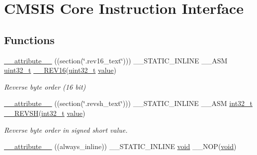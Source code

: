 \hypertarget{group___c_m_s_i_s___core___instruction_interface}{\section{C\-M\-S\-I\-S Core Instruction Interface}
\label{group___c_m_s_i_s___core___instruction_interface}
}
\subsection*{Functions}
\begin{DoxyCompactItemize}
\item 
\hyperlink{group___c_m_s_i_s___core___instruction_interface_gae84a2733711339c5eefeb0d899506b96}{\-\_\-\-\_\-attribute\-\_\-\-\_\-} ((section(\char`\"{}.rev16\-\_\-text\char`\"{}))) \-\_\-\-\_\-\-S\-T\-A\-T\-I\-C\-\_\-\-I\-N\-L\-I\-N\-E \-\_\-\-\_\-\-A\-S\-M \hyperlink{stdint_8h_a435d1572bf3f880d55459d9805097f62}{uint32\-\_\-t} \hyperlink{group___c_m_s_i_s___c_m3__core__definitions_ga8f5e0c8697e92da8a7e92732f477941d}{\-\_\-\-\_\-\-R\-E\-V16}(\hyperlink{stdint_8h_a435d1572bf3f880d55459d9805097f62}{uint32\-\_\-t} \hyperlink{protocol_8h_a4e9aec275e566b978a3ccb4e043d8c61}{value})
\begin{DoxyCompactList}\small\item\em Reverse byte order (16 bit) \end{DoxyCompactList}\item 
\hyperlink{group___c_m_s_i_s___core___instruction_interface_ga8e7a866927d3257a82b884ad14dbef4c}{\-\_\-\-\_\-attribute\-\_\-\-\_\-} ((section(\char`\"{}.revsh\-\_\-text\char`\"{}))) \-\_\-\-\_\-\-S\-T\-A\-T\-I\-C\-\_\-\-I\-N\-L\-I\-N\-E \-\_\-\-\_\-\-A\-S\-M \hyperlink{group___n_a_m_e_gafd12020da5a235dfcf0c3c748fb5baed}{int32\-\_\-t} \hyperlink{group___c_m_s_i_s___c_m3__core__definitions_gac57c8f1832bf1d42d49d62a56871a78e}{\-\_\-\-\_\-\-R\-E\-V\-S\-H}(\hyperlink{group___n_a_m_e_gafd12020da5a235dfcf0c3c748fb5baed}{int32\-\_\-t} \hyperlink{protocol_8h_a4e9aec275e566b978a3ccb4e043d8c61}{value})
\begin{DoxyCompactList}\small\item\em Reverse byte order in signed short value. \end{DoxyCompactList}\item 
\hyperlink{group___c_m_s_i_s___core___instruction_interface_ga9d077dccfe96153ce0a1255cd879715c}{\-\_\-\-\_\-attribute\-\_\-\-\_\-} ((always\-\_\-inline)) \-\_\-\-\_\-\-S\-T\-A\-T\-I\-C\-\_\-\-I\-N\-L\-I\-N\-E \hyperlink{group___n_a_m_e_ga18028b8badbf1ea7e704ccac3c488e82}{void} \-\_\-\-\_\-\-N\-O\-P(\hyperlink{group___n_a_m_e_ga18028b8badbf1ea7e704ccac3c488e82}{void})

\end{DoxyCompactItemize}

